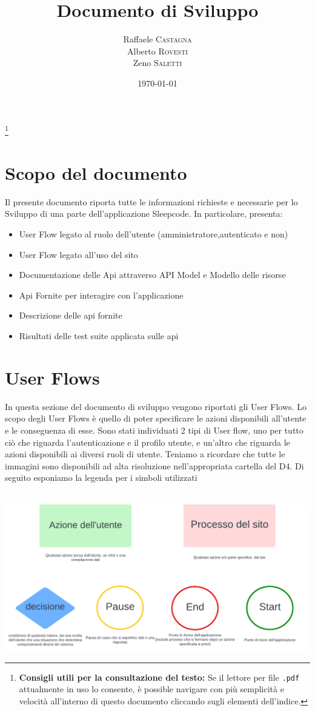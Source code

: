 \documentclass[11pt, a4paper]{article}
\title{Documento di Sviluppo}
\author{Raffaele \textsc{Castagna}\\
Alberto \textsc{Rovesti}\\
Zeno \textsc{Saletti}}
\date{\today}
\theoremstyle{definition}
\newcommand\blfootnote[1]{%
  \begingroup
  \renewcommand\thefootnote{}\footnote{#1}%
  \addtocounter{footnote}{-1}%
  \endgroup
}
\begin{document}


\tableofcontents\blfootnote{\textbf{Consigli utili per la consultazione del testo:} Se il lettore per file \texttt{.pdf} attualmente in uso lo consente, è possible navigare con più semplicità e velocità all'interno di questo documento cliccando sugli elementi dell'indice.}


\newpage
\section{Scopo del documento}
Il presente documento riporta tutte le informazioni richieste e necessarie per lo Sviluppo
di una parte dell'applicazione Sleepcode.
In particolare, presenta:
\begin{itemize}
  \item User Flow legato al ruolo dell'utente (amministratore,autenticato e non)
  \item User Flow legato all'uso del sito
  \item Documentazione delle Api attraverso API Model e Modello delle risorse
  \item Api Fornite per interagire con l'applicazione
  \item Descrizione delle api fornite
  \item Risultati delle test suite applicata sulle api
\end{itemize}


\newpage
\section{User Flows}
In questa sezione del documento di sviluppo vengono riportati gli User Flows. Lo scopo degli User Flows
è quello di poter specificare le azioni disponibili all'utente e le conseguenza di esse. Sono stati individuati 2 tipi di User flow, uno per 
tutto ciò che riguarda l'autenticazione e il profilo utente, e un'altro che riguarda le azioni disponibili ai diversi ruoli di utente.
Teniamo a ricordare che tutte le immagini sono disponibili ad alta risoluzione nell'appropriata cartella del D4.
Di seguito esponiamo la legenda per i simboli utilizzati
\\
\\
\begin{center}
  \includegraphics{materiale/UserFlow Symbols.png}
\end{center}
\newpage
\end{document}
